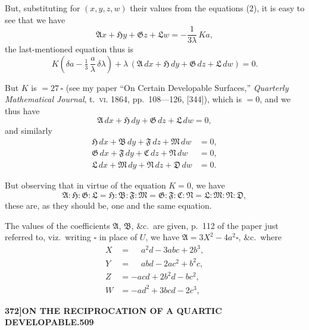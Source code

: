\documentclass[11pt,a4paper]{article}
\begin{document}
But, substituting for $(x, y, z, w)$ their values from the equations (2), it is easy to see that we have
\[
\mathfrak{A}x + \mathfrak{H}y + \mathfrak{G}z + \mathfrak{L}w = -\frac{1}{3\lambda}\,Ka,
\]
the last-mentioned equation thus is
\[
K\left(\delta a - \tfrac{1}{3}\,\frac{a}{\lambda}\,\delta\lambda\right) + \lambda\,(\mathfrak{A}\,dx + \mathfrak{H}\,dy + \mathfrak{G}\,dz + \mathfrak{L}\,dw) = 0.
\]

But $K$ is $= 27\,\square$ (see my paper ``On Certain Developable Surfaces,'' \textit{Quarterly Mathematical Journal}, t.~\textsc{vi}. 1864, pp.~108---126, [344]), which is $= 0$, and we thus have
\[
\mathfrak{A}\,dx + \mathfrak{H}\,dy + \mathfrak{G}\,dz + \mathfrak{L}\,dw = 0,
\]
and similarly
\begin{align*}
\mathfrak{H}\,dx + \mathfrak{B}\,dy + \mathfrak{F}\,dz + \mathfrak{M}\,dw &= 0,\\
\mathfrak{G}\,dx + \mathfrak{F}\,dy + \mathfrak{C}\,dz + \mathfrak{N}\,dw &= 0,\\
\mathfrak{L}\,dx + \mathfrak{M}\,dy + \mathfrak{N}\,dz + \mathfrak{D}\,dw &= 0.
\end{align*}

But observing that in virtue of the equation $K = 0$, we have
\[
\mathfrak{A} : \mathfrak{H} : \mathfrak{G} : \mathfrak{L}
= \mathfrak{H} : \mathfrak{B} : \mathfrak{F} : \mathfrak{M}
= \mathfrak{G} : \mathfrak{F} : \mathfrak{C} : \mathfrak{N}
= \mathfrak{L} : \mathfrak{M} : \mathfrak{N} : \mathfrak{D},
\]
these are, as they should be, one and the same equation.

The values of the coefficients $\mathfrak{A}$, $\mathfrak{B}$, \&c.\ are given, p.~112 of the paper just referred to, viz.~writing $\square$ in place of $U$, we have $\mathfrak{A} = 3X^{2} - 4a^{2}\square$, \&c.\ where
\begin{align*}
X &= \phantom{-}a^{2}d - 3abc + 2b^{3},\\
Y &= \phantom{-}abd - 2ac^{2} + b^{2}c,\\
Z &= -acd + 2b^{2}d - bc^{2},\\
W &= -ad^{2} + 3bcd - 2c^{3},
\end{align*}

\newpage
\begin{flushright}
\textbf{372]\hspace{1em}ON THE RECIPROCATION OF A QUARTIC DEVELOPABLE.\hfill509}
\end{flushright}

\vspace{12pt}
\end{document}
